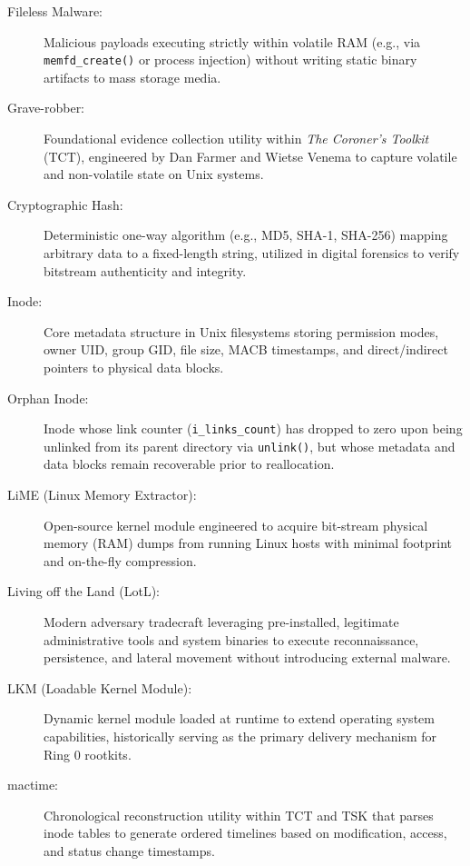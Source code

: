 \begin{description}
    \item[Fileless Malware:] Malicious payloads executing strictly within volatile RAM (e.g., via \texttt{memfd\_create()} or process injection) without writing static binary artifacts to mass storage media.

    \item[Grave-robber:] Foundational evidence collection utility within \textit{The Coroner's Toolkit} (TCT), engineered by Dan Farmer and Wietse Venema to capture volatile and non-volatile state on Unix systems.

    \item[Cryptographic Hash:] Deterministic one-way algorithm (e.g., MD5, SHA-1, SHA-256) mapping arbitrary data to a fixed-length string, utilized in digital forensics to verify bitstream authenticity and integrity.

    \item[Inode:] Core metadata structure in Unix filesystems storing permission modes, owner UID, group GID, file size, MACB timestamps, and direct/indirect pointers to physical data blocks.

    \item[Orphan Inode:] Inode whose link counter (\texttt{i\_links\_count}) has dropped to zero upon being unlinked from its parent directory via \texttt{unlink()}, but whose metadata and data blocks remain recoverable prior to reallocation.

    \item[LiME (Linux Memory Extractor):] Open-source kernel module engineered to acquire bit-stream physical memory (RAM) dumps from running Linux hosts with minimal footprint and on-the-fly compression.

    \item[Living off the Land (LotL):] Modern adversary tradecraft leveraging pre-installed, legitimate administrative tools and system binaries to execute reconnaissance, persistence, and lateral movement without introducing external malware.

    \item[LKM (Loadable Kernel Module):] Dynamic kernel module loaded at runtime to extend operating system capabilities, historically serving as the primary delivery mechanism for Ring 0 rootkits.

    \item[mactime:] Chronological reconstruction utility within TCT and TSK that parses inode tables to generate ordered timelines based on modification, access, and status change timestamps.


\end{description}
